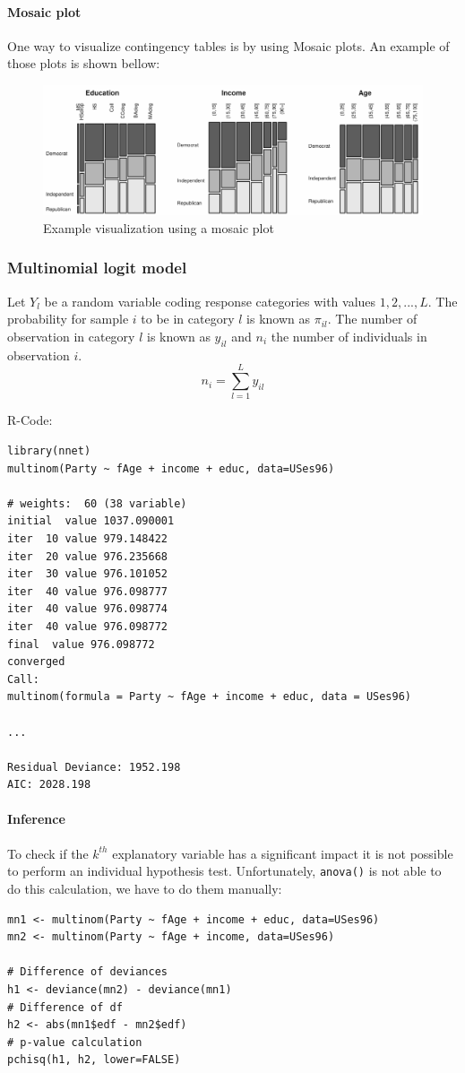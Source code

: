 \paragraph{Mosaic plot}
One way to visualize contingency tables is by using Mosaic plots. An example of those plots is shown bellow:
\begin{figure}[H]
	\centering
	\includegraphics[width=.8\textwidth]{images/example-mosaic.png}
	\caption{Example visualization using a mosaic plot}
\end{figure}

\subsubsection{Multinomial logit model}
Let $Y_l$ be a random variable coding response categories with values $1, 2, ..., L$. The probability for sample $i$ to be in category $l$ is known as $\pi_{il}$. The number of observation in category $l$ is known as $y_{il}$ and $n_i$ the number of individuals in observation $i$.
\begin{equation*}
n_i = \sum_{l=1}^{L}y_{il}
\end{equation*}

R-Code:
\begin{lstlisting}
library(nnet)
multinom(Party ~ fAge + income + educ, data=USes96)

# weights:  60 (38 variable)
initial  value 1037.090001 
iter  10 value 979.148422
iter  20 value 976.235668
iter  30 value 976.101052
iter  40 value 976.098777
iter  40 value 976.098774
iter  40 value 976.098772
final  value 976.098772 
converged
Call:
multinom(formula = Party ~ fAge + income + educ, data = USes96)

...

Residual Deviance: 1952.198 
AIC: 2028.198 
\end{lstlisting}

\paragraph{Inference}
To check if the $k^{th}$ explanatory variable has a significant impact it is not possible to perform an individual hypothesis test. Unfortunately, \lstinline{anova()} is not able to do this calculation, we have to do them manually:
\begin{lstlisting}
mn1 <- multinom(Party ~ fAge + income + educ, data=USes96)
mn2 <- multinom(Party ~ fAge + income, data=USes96)

# Difference of deviances
h1 <- deviance(mn2) - deviance(mn1)
# Difference of df
h2 <- abs(mn1$edf - mn2$edf)
# p-value calculation
pchisq(h1, h2, lower=FALSE)
\end{lstlisting}

